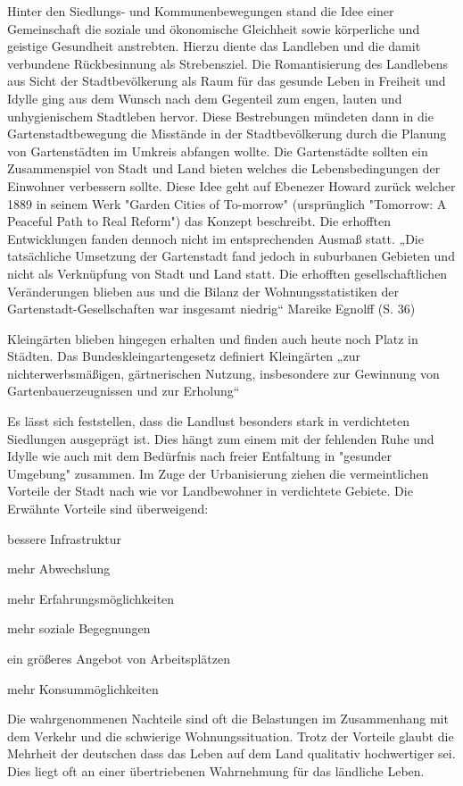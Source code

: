 \documentclass{scrartcl}
\begin{document}
Hinter den Siedlungs- und Kommunenbewegungen stand die Idee einer Gemeinschaft die soziale und ökonomische Gleichheit sowie körperliche und geistige Gesundheit anstrebten. Hierzu diente das Landleben und die damit verbundene Rückbesinnung als Strebensziel. Die Romantisierung des Landlebens aus Sicht der Stadtbevölkerung als Raum für das gesunde Leben in Freiheit und Idylle ging aus dem Wunsch nach dem Gegenteil zum engen, lauten und unhygienischem Stadtleben hervor. Diese Bestrebungen mündeten dann in die Gartenstadtbewegung die Misstände in der Stadtbevölkerung durch die Planung von Gartenstädten im Umkreis abfangen wollte. Die Gartenstädte sollten ein Zusammenspiel von Stadt und Land bieten welches die Lebensbedingungen der Einwohner verbessern sollte. Diese Idee geht auf Ebenezer Howard zurück welcher 1889 in seinem Werk "Garden Cities of To-morrow" (ursprünglich "Tomorrow: A Peaceful Path to Real Reform") das Konzept beschreibt. Die erhofften Entwicklungen fanden dennoch nicht im entsprechenden Ausmaß statt. „Die tatsächliche Umsetzung der Gartenstadt fand jedoch in suburbanen Gebieten und nicht als Verknüpfung von Stadt und Land statt. Die erhofften gesellschaftlichen Veränderungen blieben aus und die Bilanz der Wohnungsstatistiken der Gartenstadt-Gesellschaften war insgesamt niedrig“ Mareike Egnolff (S. 36) 

Kleingärten blieben hingegen erhalten und finden auch heute noch Platz in Städten. Das Bundeskleingartengesetz definiert Kleingärten „zur nichterwerbsmäßigen, gärtnerischen Nutzung, insbesondere zur Gewinnung von Gartenbauerzeugnissen und zur Erholung“ 

Es lässt sich feststellen, dass die Landlust besonders stark in verdichteten Siedlungen ausgeprägt ist. Dies hängt zum einem mit der fehlenden Ruhe und Idylle wie auch mit dem Bedürfnis nach freier Entfaltung in "gesunder Umgebung" zusammen. Im Zuge der Urbanisierung ziehen die vermeintlichen Vorteile der Stadt nach wie vor Landbewohner in verdichtete Gebiete. Die Erwähnte Vorteile sind überweigend: 

\item bessere Infrastruktur
\item mehr Abwechslung
\item mehr Erfahrungsmöglichkeiten 
\item mehr soziale Begegnungen
\item ein größeres Angebot von Arbeitsplätzen
\item mehr Konsummöglichkeiten

Die wahrgenommenen Nachteile sind oft die Belastungen im Zusammenhang mit dem Verkehr und die schwierige Wohnungssituation. Trotz der Vorteile glaubt die Mehrheit der deutschen dass das Leben auf dem Land qualitativ hochwertiger sei. Dies liegt oft an einer übertriebenen Wahrnehmung für das ländliche Leben.
\end{document}
